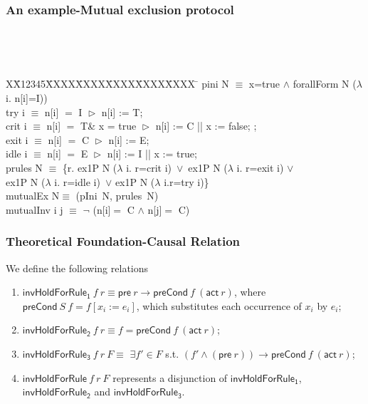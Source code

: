 \documentclass{beamer}
\newlength{\fminilength}
\newenvironment{fmini}[1][\linewidth]
  {\setlength{\fminilength}{#1\fboxsep-2\fboxrule}%
   \vspace{2ex}\noindent\begin{lrbox}{\fminibox}\begin{minipage}{\fminilength}%
   \mbox{ }\hfill\vspace{-2.5ex}}%
  {\end{minipage}\end{lrbox}\vspace{1ex}\hspace{0ex}%
   \framebox{\usebox{\fminibox}}}
\newenvironment{specification}
{\noindent\scriptsize
\tt\begin{fmini}\begin{tabbing}X\=X12345\=XXXX\=XXXX\=XXXX\=XXXX\=XXXX
\=\+\kill} {\end{tabbing}\normalfont\end{fmini}}
\def \eqc {= }
\def \andc {\wedge }
\begin{document}
\begin{frame}\frametitle{An example-Mutual exclusion protocol}

\begin{specification}
 pini  N $\equiv$
   x=true $\wedge$  forallForm N ($\lambda$ i. n[i]=I))\\

    try i $\equiv$ n[i] $\eqc$ I $\vartriangleright$ n[i] := T; \\

    crit i $\equiv$ n[i] $\eqc$ T\& x = true $\vartriangleright$  n[i] := C || x := false;  ;\\

%
   exit i $\equiv$ n[i] $\eqc$ C $\vartriangleright$ n[i] := E; \\


   idle  i $\equiv$  n[i] $\eqc$ E $\vartriangleright$ n[i] := I ||  x := true;
  \\%
   prules N $\equiv$ \{r. ex1P N ($\lambda$ i. r=crit   i)~$\vee$~ex1P N ($\lambda$ i. r=exit
i)  $\vee$\\
 ex1P N ($\lambda$ i. r=idle i)~$\vee$ ex1P N ($\lambda$ i.r=try i)\}\\

mutualEx N$\equiv$ (pIni~N, prules~N)\\

mutualInv i j $\equiv$
  $\neg$ (n[i]$\eqc$ C $\andc$ n[j]$\eqc$ C)\\

\end{specification}
\end{frame}


\begin{frame}\frametitle{Theoretical Foundation-Causal Relation}
\begin{definition}
We define the following relations
\begin{enumerate}
\item $\mathsf{invHoldForRule_1} ~f ~r \equiv \mathsf{pre}~ r \longrightarrow \mathsf{preCond}~ f ~(\mathsf{act}~ r)$, where $\mathsf{preCond}~S~f=f[x_i:=e_i]$, which substitutes each
occurrence of $x_i$ by $e_i$;
\item $\mathsf{invHoldForRule_2}~ f~ r \equiv f = \mathsf{preCond}~ f~(\mathsf{act}~ r)$;
\item $\mathsf{invHoldForRule_3}~ f~ r ~F \equiv$  $\exists f' \in F$ s.t.
$(f' \wedge (\mathsf{pre}~ r)) \longrightarrow \mathsf{preCond} ~f ~(\mathsf{act}   ~r)$;
\item $\mathsf{invHoldForRule}~ f~ r ~F$ represents a disjunction of $\mathsf{invHoldForRule_1}$, $\mathsf{invHoldForRule_2}$
and $\mathsf{invHoldForRule_3}$.
\end{enumerate}
\end{definition}
\end{frame}
\end{document}
